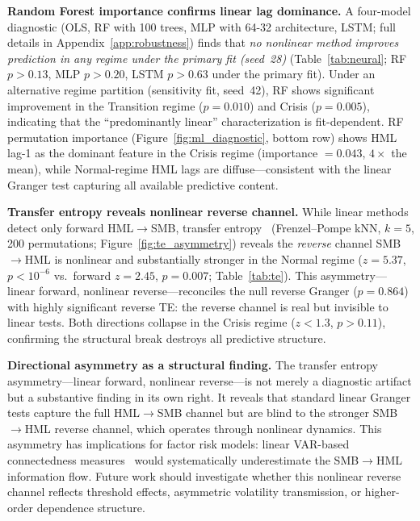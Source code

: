 \documentclass[sigconf,anonymous]{acmart}
\begin{document}
\textbf{Random Forest importance confirms linear lag dominance.}
A four-model diagnostic (OLS, RF with 100 trees, MLP with 64-32 architecture,
LSTM; full details in Appendix~\ref{app:robustness}) finds that
\emph{no nonlinear method improves prediction in any regime under the primary fit (seed~28)}
(Table~\ref{tab:neural}; RF $p > 0.13$, MLP $p > 0.20$, LSTM $p > 0.63$
under the primary fit). Under an alternative regime partition (sensitivity fit, seed~42), RF shows significant improvement in the Transition regime ($p = 0.010$) and Crisis ($p = 0.005$), indicating that the ``predominantly linear'' characterization is fit-dependent.
RF permutation importance
(Figure~\ref{fig:ml_diagnostic}, bottom row) shows HML lag-1 as the
dominant feature in the Crisis regime (importance $= 0.043$,
$4\times$ the mean), while Normal-regime HML lags are diffuse---consistent
with the linear Granger test capturing all available predictive content.

\textbf{Transfer entropy reveals nonlinear reverse channel.}
While linear methods detect only forward HML$\to$SMB, transfer
entropy~\cite{schreiber2000measuring,barnett2009granger} (Frenzel--Pompe
kNN, $k = 5$, 200 permutations; Figure~\ref{fig:te_asymmetry})
reveals the \emph{reverse} channel SMB$\to$HML is nonlinear and
substantially stronger in the Normal regime ($z = 5.37$, $p < 10^{-6}$
vs.\ forward $z = 2.45$, $p = 0.007$; Table~\ref{tab:te}).
This asymmetry---linear forward, nonlinear reverse---reconciles the null
reverse Granger ($p = 0.864$) with highly significant reverse TE:
the reverse channel is real but invisible to linear tests.
Both directions collapse in the Crisis regime ($z < 1.3$, $p > 0.11$),
confirming the structural break destroys all predictive structure.

\textbf{Directional asymmetry as a structural finding.}
The transfer entropy asymmetry---linear forward, nonlinear reverse---is not merely a diagnostic artifact but a substantive finding in its own right. It reveals that standard linear Granger tests capture the full HML$\to$SMB channel but are blind to the stronger SMB$\to$HML reverse channel, which operates through nonlinear dynamics. This asymmetry has implications for factor risk models: linear VAR-based connectedness measures~\cite{diebold2012better} would systematically underestimate the SMB$\to$HML information flow. Future work should investigate whether this nonlinear reverse channel reflects threshold effects, asymmetric volatility transmission, or higher-order dependence structure.
\end{document}
